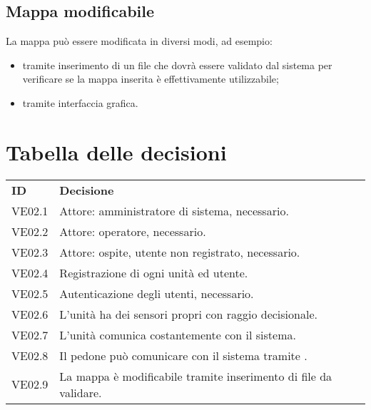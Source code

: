 \documentclass[]{article}
\begin{document}
		\subsection{Mappa modificabile}
		La mappa può essere modificata in diversi modi, ad esempio:
		\begin{itemize}
			\item tramite inserimento di un file che dovrà essere validato dal sistema per verificare se la mappa inserita è effettivamente utilizzabile;
			\item tramite interfaccia grafica.
		\end{itemize}
	
	\newpage
	
	\section{Tabella delle decisioni}

\begin{table} [h!]
	\begin{center}
		\begin{tabular} { m{2cm} m{14cm} }
			\rowcolor{lightgray}
			\textbf{ID} & \textbf{Decisione}\\
			VE02.1 & Attore: amministratore di sistema, necessario.\\
			VE02.2 & Attore: operatore, necessario. \\
			VE02.3 & Attore: ospite, utente non registrato, necessario. \\
			VE02.4 & Registrazione di ogni unità ed utente. \\
			VE02.5 & Autenticazione degli utenti, necessario. \\
			VE02.6 & L'unità ha dei sensori propri con raggio decisionale. \\
			VE02.7 & L'unità comunica costantemente con il sistema.\\
			VE02.8 & Il pedone può comunicare con il sistema tramite \glock{Bluetooth}.\\
			VE02.9 & La mappa è modificabile tramite inserimento di file da validare.
		\end{tabular}
	\end{center}
\end{table}
\end{document}

